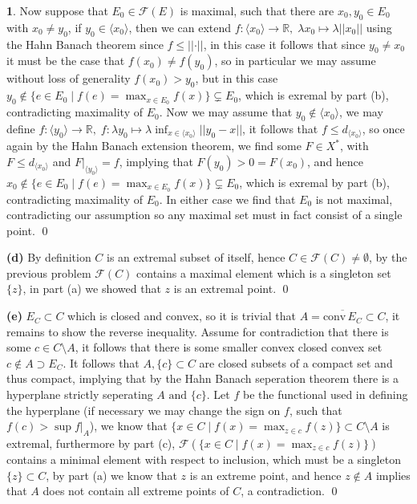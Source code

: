 \documentclass[10.5pt]{article}
\theoremstyle{definition}
\newtheorem{pb}{}
\newcommand{\set}[1]{\{#1\}}
\newcommand{\norm}[1]{\lvert\lvert#1\rvert\rvert}
\newcommand{\tand}{\text{ and }}
\newcommand{\gen}[1]{\langle #1 \rangle}
\begin{document}
\begin{pb}
        Now suppose that \(E_0 \in \mathcal{F}(E)\) is maximal, such that there are \(x_0,y_0 \in E_0\) with \(x_0 \neq y_0\), if \(y_0 \in \gen{x_0}\), then we can extend \(f: \gen{x_0} \to \mathbb{R}, \; \lambda x_0 \mapsto \lambda\norm{x_0}\) using the Hahn Banach theorem since \(f \leq \norm{\cdot}\), in this case it follows that since \(y_0 \neq x_0\) it must be the case that \(f(x_0) \neq f(y_0)\), so in particular we may assume without loss of generality \(f(x_0) > y_0\), but in this case \(y_0 \not \in \set{e \in E_0 \mid f(e) = \max_{x \in E_0}f(x)} \subsetneq E_0\), which is exremal by part (b), contradicting maximality of \(E_0\). Now we may assume that \(y_0 \not \in \gen{x_0}\), we may define \(f: \gen{y_0} \to \mathbb{R}, \; f: \lambda y_0 \mapsto \lambda\inf_{x \in \gen{x_0}}\norm{y_0 - x}\), it follows that \(f \leq d_{\gen{x_0}}\), so once again by the Hahn Banach extension theorem, we find some \(F \in X^*\), with \(F \leq d_{\gen{x_0}}\) and \(F \vert_{\gen{y_0}} = f\), implying that \(F(y_0) > 0 = F(x_0)\), and hence \(x_0 \not \in \set{e \in E_0 \mid f(e) = \max_{x \in E_0}f(x)} \subsetneq E_0\), which is exremal by part (b), contradicting maximality of \(E_0\). In either case we find that \(E_0\) is not maximal, contradicting our assumption so any maximal set must in fact consist of a single point. \qed

        \textbf{(d)} By definition \(C\) is an extremal subset of itself, hence \(C \in \mathcal{F}(C) \neq \emptyset\), by the previous problem \(\mathcal{F}(C)\) contains a maximal element which is a singleton set \(\set{z}\), in part (a) we showed that \(z\) is an extremal point. \qed

        \textbf{(e)} \(E_C \subset C\) which is closed and convex, so it is trivial that \(A = \overline{\text{conv}\,E_C} \subset C\), it remains to show the reverse inequality. Assume for contradiction that there is some \(c \in C \setminus A\), it follows that there is some smaller convex closed convex set \(c \not \in A \supset E_C\). It follows that \(A, \set{c} \subset C\) are closed subsets of a compact set and thus compact, implying that by the Hahn Banach seperation theorem there is a hyperplane strictly seperating \(A \tand \set{c}\). Let \(f\) be the functional used in defining the hyperplane (if necessary we may change the sign on \(f\), such that \(f(c) > \sup f\vert_A\)), we know that \(\set{x \in C \mid f(x) = \max_{z \in c}f(z)} \subset C \setminus A\) is extremal, furthermore by part (c), \(\mathcal{F}(\set{x \in C \mid f(x) = \max_{z \in c}f(z)})\) contains a minimal element with respect to inclusion, which must be a singleton \(\set{z} \subset C\), by part (a) we know that \(z\) is an extreme point, and hence \(z \not \in A\) implies that \(A\) does not contain all extreme points of \(C\), a contradiction. \qed
    \end{pb}
\end{document}
